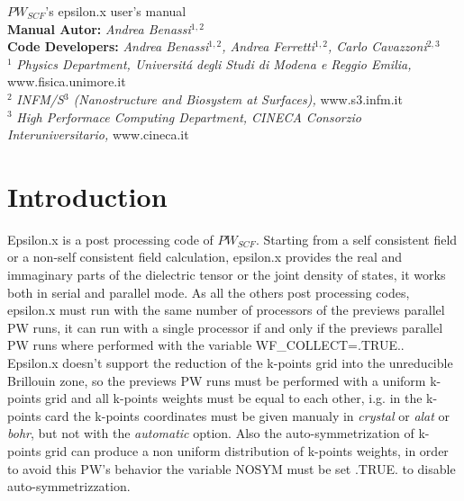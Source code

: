 \documentclass[twocolumn]{article}
\begin{document}
\begin{titlepage}
\Huge
\begin{center}
$PW_{SCF}$'s epsilon.x user's manual\\[1.5cm]
\normalsize
\textbf{Manual Autor:}
\emph{Andrea Benassi}$^{1,2}$\\[0.3cm]
\textbf{Code Developers:}
\emph{Andrea Benassi$^{1,2}$, Andrea Ferretti$^{1,2}$, Carlo Cavazzoni$^{2,3}$}\\[1cm]
$^{1}$ \emph{Physics Department, Universit\'a degli Studi di Modena e Reggio Emilia,} www.fisica.unimore.it\\
$^{2}$ \emph{INFM/S$^{3}$ (Nanostructure and Biosystem at Surfaces),} www.s3.infm.it\\
$^{3}$ \emph{High Performace Computing Department, CINECA Consorzio Interuniversitario,} www.cineca.it\\
\end{center}
\end{titlepage}
\newpage
\section{Introduction}
Epsilon.x is a post processing code of $PW_{SCF}$. Starting from a self consistent field or a non-self consistent field calculation,
epsilon.x provides the real and immaginary parts of the dielectric tensor or the joint density of states, it works both in serial and
parallel mode. As all the others post processing codes, epsilon.x must run with the same number of
processors of the previews parallel PW runs, it can run with a single processor if and only if the previews parallel PW runs where
performed with the
variable WF\_COLLECT=.TRUE..\\
Epsilon.x doesn't support the reduction of the k-points grid into the unreducible Brillouin zone, so the previews PW runs must be 
performed with a uniform k-points grid and all k-points weights must be equal to each other, i.g. in the k-points card the k-points
coordinates must be given manualy in \emph{crystal} or \emph{alat} or \emph{bohr}, but not with the \emph{automatic} option. Also the 
auto-symmetrization of k-points grid can produce a non uniform distribution of k-points weights, in order to avoid this
PW's behavior the variable NOSYM must be set .TRUE. to disable auto-symmetrizzation.
\end{document}
